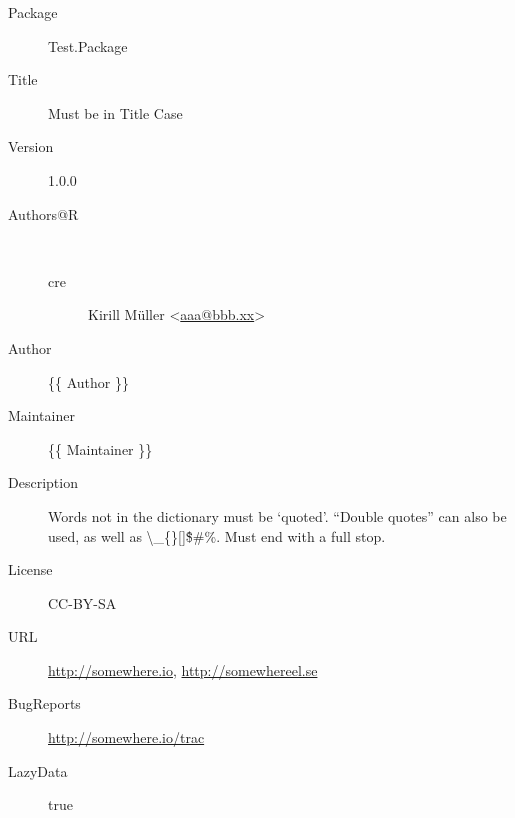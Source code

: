 \begin{description}
  \raggedright{}
  \item[Package] Test.Package
  \item[Title] Must be in Title Case
  \item[Version] 1.0.0
  \item[Authors@R] \\
    \begin{description}
      \item[cre] Kirill Müller <\href{mailto:aaa@bbb.xx}{aaa@bbb.xx}>
    \end{description}
  \item[Author] \{\{ Author \}\}
  \item[Maintainer] \{\{ Maintainer \}\}
  \item[Description] Words not in the dictionary must be `quoted'. ``Double quotes'' can also be used, as well as \textbackslash \_\{\}[]\^\$\#\%. Must end with a full stop.
  \item[License] CC-BY-SA
  \item[URL] \url{http://somewhere.io}, \url{http://somewhereel.se}
  \item[BugReports] \url{http://somewhere.io/trac}
  \item[LazyData] true
\end{description}
